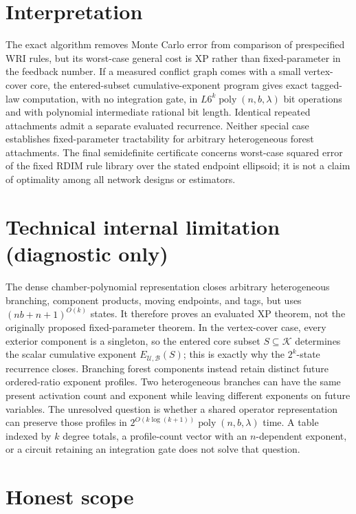 \documentclass{article}
\begin{document}
\section{Interpretation}

The exact algorithm removes Monte Carlo error from comparison of prespecified WRI rules, but its worst-case general cost is XP rather than fixed-parameter in the feedback number. If a measured conflict graph comes with a small vertex-cover core, the entered-subset cumulative-exponent program gives exact tagged-law computation, with no integration gate, in \(L6^k\operatorname{poly}(n,b,\lambda)\) bit operations and with polynomial intermediate rational bit length. Identical repeated attachments admit a separate evaluated recurrence. Neither special case establishes fixed-parameter tractability for arbitrary heterogeneous forest attachments. The final semidefinite certificate concerns worst-case squared error of the fixed RDIM rule library over the stated endpoint ellipsoid; it is not a claim of optimality among all network designs or estimators.

\section*{Technical internal limitation (diagnostic only)}

The dense chamber-polynomial representation closes arbitrary heterogeneous branching, component products, moving endpoints, and tags, but uses \((nb+n+1)^{O(k)}\) states. It therefore proves an evaluated XP theorem, not the originally proposed fixed-parameter theorem. In the vertex-cover case, every exterior component is a singleton, so the entered core subset \(S\subseteq\mathcal K\) determines the scalar cumulative exponent \(E_{\mathcal U,\mathcal B}(S)\); this is exactly why the \(2^k\)-state recurrence closes. Branching forest components instead retain distinct future ordered-ratio exponent profiles. Two heterogeneous branches can have the same present activation count and exponent while leaving different exponents on future variables. The unresolved question is whether a shared operator representation can preserve those profiles in \(2^{O(k\log(k+1))}\operatorname{poly}(n,b,\lambda)\) time. A table indexed by \(k\) degree totals, a profile-count vector with an \(n\)-dependent exponent, or a circuit retaining an integration gate does not solve that question.

\section{Honest scope}
\end{document}
